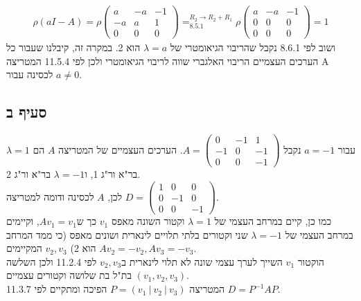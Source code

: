 \documentclass{article}
\DeclareMathOperator*{\equals}{=}
\begin{document}
\begin{align*}
    \rho(aI-A)=\rho\begin{pmatrix}
        a  & -a & -1 \\
        -a & a  & 1  \\
        0  & 0  & 0
    \end{pmatrix}\equals^{R_2\rightarrow R_2+R_1}_{8.5.1}
    \rho\begin{pmatrix}
        a & -a & -1 \\
        0 & 0  & 0  \\
        0 & 0  & 0
    \end{pmatrix}=1
\end{align*}
ושוב לפי 8.6.1 נקבל שהריבוי הגיאומטרי של $\lambda=a$ הוא 2. במקרה זה, קיבלנו שעבור כל הערכים העצמיים הריבוי האלגברי שווה לריבוי הגיאומטרי ולכן לפי 11.5.4 המטריצה A לכסינה עבור $a\ne 0$.

\subsection*{סעיף ב}

עבור $a=-1$ נקבל $A=\begin{pmatrix}
        0  & -1 & 1  \\
        -1 & 0  & -1 \\
        0  & 0  & -1
    \end{pmatrix}$.
הערכים העצמיים של המטריצה $A$ הם $\lambda=1$ בר"א ור"ג 1, ו$\lambda=-1$ בר"א ור"ג 2.\\
לכן, $A$ לכסינה ודומה למטריצה $D=\begin{pmatrix}
        1 & 0  & 0  \\
        0 & -1 & 0  \\
        0 & 0  & -1
    \end{pmatrix}$. \\
כמו כן, קיים במרחב העצמי של $\lambda=1$ וקטור השונה מאפס $v_1$ כך ש$Av_1=v_1$, וקיימים במרחב העצמי של $\lambda=-1$ שני וקטורים בלתי תלויים לינארית ושונים מאפס (כי ממד המרחב הוא 2) $v_2, v_3$ המקיימים $Av_2=-v_2, Av_3=-v_3$. \\
הוקטור $v_1$ השייך לערך עצמי שונה לא תלוי לינארית ב$v_2, v_3$ לפי 11.2.4 ולכן השלשה $(v_1, v_2, v_3)$ בת"ל בת שלושה וקטורים עצמיים. \\
המטריצה $P=(v_1 \ | \ v_2 \ | \ v_3)$ הפיכה ומתקיים לפי 11.3.7 $D=P^{-1}AP$.

\pagebreak
\end{document}
